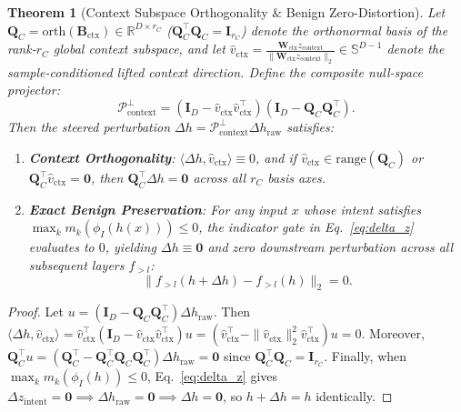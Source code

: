 \documentclass[11pt,twocolumn,a4paper]{article}
\newtheorem{theorem}{Theorem}
\begin{document}
\begin{theorem}[Context Subspace Orthogonality \& Benign Zero-Distortion]
\label{thm:nullspace}
Let $\mathbf{Q}_C = \mathrm{orth}(\mathbf{B}_{\text{ctx}}) \in \mathbb{R}^{D \times r_C}$ ($\mathbf{Q}_C^\top \mathbf{Q}_C = \mathbf{I}_{r_C}$) denote the orthonormal basis of the rank-$r_C$ global context subspace, and let $\hat{v}_{\text{ctx}} = \frac{\mathbf{W}_{\text{ctx}} z_{\text{context}}}{\|\mathbf{W}_{\text{ctx}} z_{\text{context}}\|_2} \in \mathbb{S}^{D-1}$ denote the sample-conditioned lifted context direction. Define the composite null-space projector:
\begin{equation}
    \mathcal{P}_{\text{context}}^\perp = \left(\mathbf{I}_D - \hat{v}_{\text{ctx}}\hat{v}_{\text{ctx}}^\top\right)\left(\mathbf{I}_D - \mathbf{Q}_C \mathbf{Q}_C^\top\right).
    \label{eq:nullspace_proj}
\end{equation}
Then the steered perturbation $\Delta h = \mathcal{P}_{\text{context}}^\perp \Delta h_{\text{raw}}$ satisfies:
\begin{enumerate}[leftmargin=*,nosep]
    \item \textbf{Context Orthogonality}: $\langle \Delta h, \hat{v}_{\text{ctx}} \rangle \equiv 0$, and if $\hat{v}_{\text{ctx}} \in \mathrm{range}(\mathbf{Q}_C)$ or $\mathbf{Q}_C^\top \hat{v}_{\text{ctx}} = \mathbf{0}$, then $\mathbf{Q}_C^\top \Delta h = \mathbf{0}$ across all $r_C$ basis axes.
    \item \textbf{Exact Benign Preservation}: For any input $x$ whose intent satisfies $\max_k m_k(\phi_I(h(x))) \le 0$, the indicator gate in Eq.~\eqref{eq:delta_z} evaluates to $0$, yielding $\Delta h \equiv \mathbf{0}$ and zero downstream perturbation across all subsequent layers $f_{>l}$:
    \begin{equation}
        \big\|f_{>l}(h + \Delta h) - f_{>l}(h)\big\|_2 = 0.
    \end{equation}
\end{enumerate}
\end{theorem}
\begin{proof}
Let $u = (\mathbf{I}_D - \mathbf{Q}_C \mathbf{Q}_C^\top)\Delta h_{\text{raw}}$. Then $\langle \Delta h, \hat{v}_{\text{ctx}} \rangle = \hat{v}_{\text{ctx}}^\top(\mathbf{I}_D - \hat{v}_{\text{ctx}}\hat{v}_{\text{ctx}}^\top)u = (\hat{v}_{\text{ctx}}^\top - \|\hat{v}_{\text{ctx}}\|_2^2 \hat{v}_{\text{ctx}}^\top)u = 0$. Moreover, $\mathbf{Q}_C^\top u = (\mathbf{Q}_C^\top - \mathbf{Q}_C^\top \mathbf{Q}_C \mathbf{Q}_C^\top)\Delta h_{\text{raw}} = \mathbf{0}$ since $\mathbf{Q}_C^\top \mathbf{Q}_C = \mathbf{I}_{r_C}$. Finally, when $\max_k m_k(\phi_I(h)) \le 0$, Eq.~\eqref{eq:delta_z} gives $\Delta z_{\text{intent}} = \mathbf{0} \implies \Delta h_{\text{raw}} = \mathbf{0} \implies \Delta h = \mathbf{0}$, so $h + \Delta h = h$ identically.
\end{proof}
\end{document}
